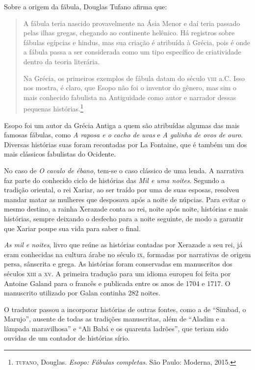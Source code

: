 \documentclass[11pt]{extarticle}
\begin{document}
Sobre a origem da fábula, Douglas Tufano afirma que:

\begin{quote}
A fábula teria nascido provavelmente na Ásia Menor e daí teria passado pelas ilhas gregas, chegando ao continente helênico. Há registros sobre fábulas egípcias e hindus, mas sua criação é atribuída à Grécia, pois é onde a fábula passa a ser considerada como um tipo específico de criatividade dentro da teoria literária. 

Na Grécia, os primeiros exemplos de fábula datam do século \textsc{viii} a.C. Isso nos mostra, é claro, que Esopo não foi o inventor do gênero, mas sim o mais conhecido fabulista na Antiguidade como autor e narrador dessas pequenas histórias.\footnote{\textsc{tufano}, Douglas. \textit{Esopo: Fábulas completas}. São Paulo: Moderna, 2015.}
\end{quote}

Esopo foi um autor da Grécia Antiga a quem são atribuídas algumas das mais famosas fábulas, como \textit{A raposa e o cacho de uvas} e \textit{A galinha de ovos de ouro}. Diversas  histórias suas foram recontadas por La Fontaine, que é também um dos mais clássicos fabulistas do Ocidente.

No caso de \textit{O cavalo de ébano}, tem-se o caso clássico de uma lenda. A narrativa faz parte do conhecido ciclo de histórias das \textit{Mil e uma noites}. Segundo a tradição oriental, o rei Xariar, ao ser traído por uma de suas esposas, resolveu mandar matar as mulheres que desposava após a noite de núpcias.
Para evitar o mesmo destino, a rainha Xerazade conta ao rei, noite após noite, histórias e mais histórias, sempre deixando o desfecho para a noite seguinte, de
modo a garantir que Xariar poupe sua vida para saber o final.

\textit{As mil e noites}, livro que reúne as histórias contadas por
Xerazade a seu rei, já eram conhecidas na cultura árabe no século \textsc{ix}, formadas por narrativas de origem persa, sânscrita e grega. As histórias foram conservadas em manuscritos
dos séculos \textsc{xiii} a \textsc{xv}. A primeira tradução para um idioma
europeu foi feita por Antoine Galand para o francês e publicada entre os anos de 1704 e 1717. O manuscrito utilizado por Galan continha 282 noites.

O tradutor passou a incorporar histórias de outras fontes, como a de ``Simbad, o Marujo'',
ausente de todas as tradições manuscritas, além de ``Aladim
e a lâmpada maravilhosa'' e ``Ali Babá e os quarenta ladrões'',
que teriam sido ouvidas de um contador de histórias sírio.
\end{document}
